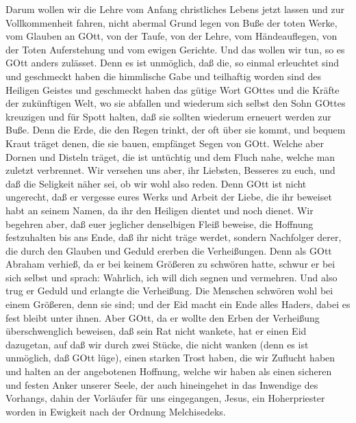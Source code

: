  Darum wollen wir die Lehre vom Anfang christliches Lebens
jetzt lassen und zur Vollkommenheit fahren, nicht abermal Grund legen
von Buße der toten Werke, vom Glauben an GOtt,  von der
Taufe, von der Lehre, vom Händeauflegen, von der Toten Auferstehung und
vom ewigen Gerichte.  Und das wollen wir tun, so es GOtt
anders zulässet.  Denn es ist unmöglich, daß die, so einmal
erleuchtet sind und geschmeckt haben die himmlische Gabe und teilhaftig
worden sind des Heiligen Geistes  und geschmeckt haben das
gütige Wort GOttes und die Kräfte der zukünftigen Welt,  wo
sie abfallen und wiederum sich selbst den Sohn GOttes kreuzigen und für
Spott halten, daß sie sollten wiederum erneuert werden zur Buße.
 Denn die Erde, die den Regen trinkt, der oft über sie
kommt, und bequem Kraut träget denen, die sie bauen, empfänget Segen von
GOtt.  Welche aber Dornen und Disteln träget, die ist
untüchtig und dem Fluch nahe, welche man zuletzt verbrennet.
 Wir versehen uns aber, ihr Liebsten, Besseres zu euch, und
daß die Seligkeit näher sei, ob wir wohl also reden.  Denn
GOtt ist nicht ungerecht, daß er vergesse eures Werks und Arbeit der
Liebe, die ihr beweiset habt an seinem Namen, da ihr den Heiligen
dientet und noch dienet.  Wir begehren aber, daß euer
jeglicher denselbigen Fleiß beweise, die Hoffnung festzuhalten bis ans
Ende,  daß ihr nicht träge werdet, sondern Nachfolger
derer, die durch den Glauben und Geduld ererben die Verheißungen.
 Denn als GOtt Abraham verhieß, da er bei keinem Größeren
zu schwören hatte, schwur er bei sich selbst  und sprach:
Wahrlich, ich will dich segnen und vermehren.  Und also
trug er Geduld und erlangte die Verheißung.  Die Menschen
schwören wohl bei einem Größeren, denn sie sind; und der Eid macht ein
Ende alles Haders, dabei es fest bleibt unter ihnen.  Aber
GOtt, da er wollte den Erben der Verheißung überschwenglich beweisen,
daß sein Rat nicht wankete, hat er einen Eid dazugetan, 
auf daß wir durch zwei Stücke, die nicht wanken (denn es ist unmöglich,
daß GOtt lüge), einen starken Trost haben, die wir Zuflucht haben und
halten an der angebotenen Hoffnung,  welche wir haben als
einen sicheren und festen Anker unserer Seele, der auch hineingehet in
das Inwendige des Vorhangs,  dahin der Vorläufer für uns
eingegangen, Jesus, ein Hoherpriester worden in Ewigkeit nach der
Ordnung Melchisedeks.

